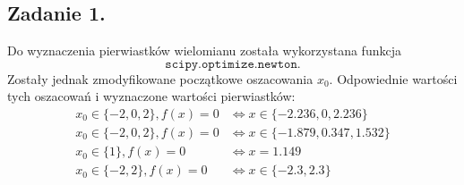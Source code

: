\documentclass[11pt, leqno]{scrartcl}
\begin{document}
    \subsection{Zadanie 1.}
    Do wyznaczenia pierwiastków wielomianu została wykorzystana
    funkcja
    \[
        \texttt{scipy.optimize.newton}.
    \]
    Zostały jednak zmodyfikowane początkowe oszacowania $x_0$.
    Odpowiednie wartości tych oszacowań i wyznaczone wartości
    pierwiastków:
    \begin{align}
            x_0 \in \{-2,0,2\}, f(x)=0 &\Leftrightarrow
                x \in \{-2.236,0,2.236\} \\
            x_0 \in \{-2,0,2\}, f(x)=0 &\Leftrightarrow
                x \in \{-1.879,0.347,1.532\} \\
            x_0 \in \{1\}, f(x)=0 &\Leftrightarrow
                x=1.149 \\
            x_0 \in \{-2,2\}, f(x)=0 &\Leftrightarrow
                x \in \{-2.3,2.3\}
    \end{align}
    
\end{document}

